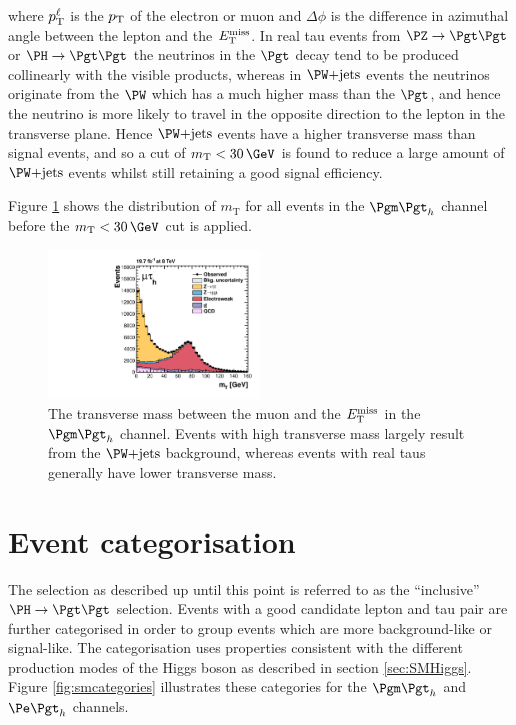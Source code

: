 where $p_{\mathrm{T}}^{\ell}$ is the $p_{\mathrm{T}}$ of the electron or muon and $\Delta\phi$ is the
difference in azimuthal angle between the lepton and the $\MET$. In real tau
events from $\PZ\to\Pgt\Pgt$ or $\PH\to\Pgt\Pgt$ the neutrinos in the $\Pgt$
decay tend to be produced collinearly with the visible products, whereas in
$\WJets$ events the neutrinos originate from the $\PW$ which has a much higher
mass than the $\Pgt$, and hence the neutrino is more likely to travel in the
opposite direction to the lepton in the transverse plane. Hence $\WJets$ events
have a higher transverse mass than signal events, and so a cut of
$m_{\text{T}}<30\,\GeV$ is found to reduce a large amount of $\WJets$ events
whilst still retaining a good signal efficiency. 

Figure \ref{fig:transversemass} shows the distribution of $m_{\text{T}}$ for all
events in the $\mutau$ channel before the $m_{\text{T}}<30\,\GeV$ cut is
applied.

\begin{figure}[htb]
\begin{center}
    \includegraphics[width=0.5\textwidth]
      {plots/htt-sm/mt_1_inclusive_mt_2012.pdf}

\end{center}
\caption[The transverse mass between the muon and the $\MET$ in the $\mutau$ channel.]{
 The transverse mass between the muon and the $\MET$ in the $\mutau$ channel.
 Events with high transverse mass largely result from the $\WJets$ background,
 whereas events with real taus generally have lower transverse mass.
}
\label{fig:transversemass}
\end{figure}


\section{Event categorisation}
\label{sec:eventcategorisation}

The selection as described up until this point is referred to as the
``inclusive'' $\HToTauTau$ selection. 
Events with a good candidate lepton and tau pair are further categorised in
order to group events which are more background-like or signal-like. The
categorisation uses properties consistent with the different production modes of
the Higgs boson as described in section \ref{sec:SMHiggs}. Figure
\ref{fig:smcategories} illustrates these categories for the $\mutau$ and $\etau$
channels.

